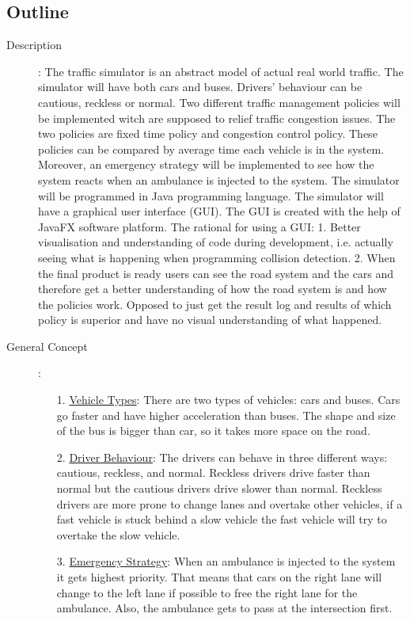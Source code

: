 \documentclass[11pt]{article}
\begin{document}
\subsection{Outline}
\begin{description}
\item[Description]:
The traffic simulator is an abstract model of actual real world traffic. The simulator will have both cars and buses. Drivers' behaviour can be cautious, reckless or normal. Two different traffic management policies will be implemented witch are supposed to relief traffic congestion issues. The two policies are fixed time policy and congestion control policy. These policies can be compared by average time each vehicle is in the system. Moreover, an emergency strategy will be implemented to see how the system reacts when an ambulance is injected to the system. 
\newline
The simulator will be programmed in Java programming language. The simulator will have a graphical user interface (GUI). The GUI is created with the help of JavaFX software platform. The rational for using a GUI: 1. Better visualisation and understanding of code during development, i.e. actually seeing what is happening when programming collision detection. 2. When the final product is ready users can see the road system and the cars and therefore get a better understanding of how the road system is and how the policies work. Opposed to just get the result log and results of which policy is superior and have no visual understanding of what happened. 
\item[General Concept]:
	\begin{itemize}
		\item[1. ]\underline{Vehicle Types}: There are two types of vehicles: cars and buses. Cars go faster and have higher acceleration than buses. The shape and size of the bus is bigger than car, so it takes more space on the road.
		
		\item[2. ] \underline{Driver Behaviour}: The drivers can behave in three different ways: cautious, reckless, and normal. Reckless drivers drive faster than normal but the cautious drivers drive slower than normal. Reckless drivers are more prone to change lanes and overtake other vehicles, if a fast vehicle is stuck behind a slow vehicle the fast vehicle will try to overtake the slow vehicle.

		\item[3. ] \underline{Emergency Strategy}: When an ambulance is injected to the system it gets highest priority. That means that cars on the right lane will change to the left lane if possible to free the right lane for the ambulance. Also, the ambulance gets to pass at the intersection first.


\end{itemize}
\end{description}
\end{document}
